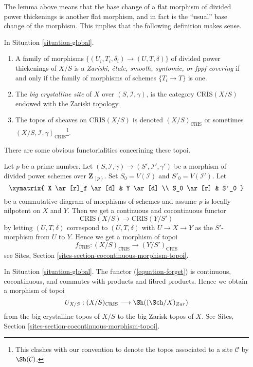 \noindent
The lemma above means that the base change of a flat morphism
of divided power thickenings is another flat morphism, and in
fact is the ``usual'' base change of the morphism. This implies
that the following definition makes sense.

\begin{definition}
\label{definition-big-crystalline-site}
In Situation \ref{situation-global}.
\begin{enumerate}
\item A family of morphisms $\{(U_i, T_i, \delta_i) \to (U, T, \delta)\}$
of divided power thickenings of $X/S$ is a {\it Zariski, \'etale, smooth,
syntomic, or fppf covering} if and only if the family of morphisms
of schemes $\{T_i \to T \}$ is one.
\item The {\it big crystalline site} of $X$ over $(S, \mathcal{I}, \gamma)$,
is the category $\text{CRIS}(X/S)$ endowed with the Zariski topology.
\item The topos of sheaves on $\text{CRIS}(X/S)$ is denoted
$(X/S)_{\text{CRIS}}$ or sometimes
$(X/S, \mathcal{I}, \gamma)_{\text{CRIS}}$\footnote{This clashes with
our convention to denote the topos associated to a site $\mathcal{C}$
by $\Sh(\mathcal{C})$.}.
\end{enumerate}
\end{definition}

\noindent
There are some obvious functorialities concerining these topoi.

\begin{remark}[Functoriality]
\label{remark-functoriality-big-cris}
Let $p$ be a prime number.
Let $(S, \mathcal{I}, \gamma) \to (S', \mathcal{I}', \gamma')$ be a
morphism of divided power schemes over $\mathbf{Z}_{(p)}$.
Set $S_0 = V(\mathcal{I})$ and $S'_0 = V(\mathcal{I}')$.
Let
$$
\xymatrix{
X \ar[r]_f \ar[d] & Y \ar[d] \\
S_0 \ar[r] & S'_0
}
$$
be a commutative diagram of morphisms of schemes and assume $p$ is
locally nilpotent on $X$ and $Y$. Then we get a continuous and
cocontinuous functor
$$
\text{CRIS}(X/S) \longrightarrow \text{CRIS}(Y/S')
$$
by letting $(U, T, \delta)$ correspond to $(U, T, \delta)$
with $U \to X \to Y$ as the $S'$-morphism from $U$ to $Y$.
Hence we get a morphism of topoi
$$
f_{\text{CRIS}} : (X/S)_{\text{CRIS}} \longrightarrow (Y/S')_{\text{CRIS}}
$$
see Sites, Section \ref{sites-section-cocontinuous-morphism-topoi}.
\end{remark}

\begin{remark}
\label{remark-compare-big-zariski}
In Situation \ref{situation-global}.
The functor (\ref{equation-forget}) is continuous, cocontinuous, and
commutes with products and fibred products.
Hence we obtain a morphism of topoi
$$
U_{X/S} : (X/S)_{\text{CRIS}} \longrightarrow \Sh((\Sch/X)_{Zar})
$$
from the big crystalline topos of $X/S$ to the big Zarisk topos of $X$.
See Sites, Section \ref{sites-section-cocontinuous-morphism-topoi}.
\end{remark}


